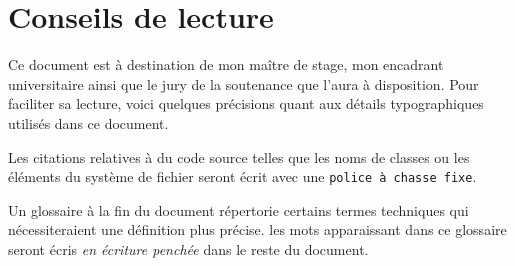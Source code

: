 \section*{Conseils de lecture}
Ce document est à destination de mon maître de stage, mon encadrant universitaire ainsi que le jury de la soutenance que l'aura à disposition. Pour faciliter sa lecture, voici quelques précisions quant aux détails typographiques utilisés dans ce document.

Les citations relatives à du code source telles que les noms de classes ou les éléments du système de fichier seront écrit avec une {\tt police à chasse fixe}.

Un glossaire à la fin du document répertorie certains termes techniques qui nécessiteraient une définition plus précise. les mots apparaissant dans ce glossaire seront écris {\it en écriture penchée} dans le reste du document.
